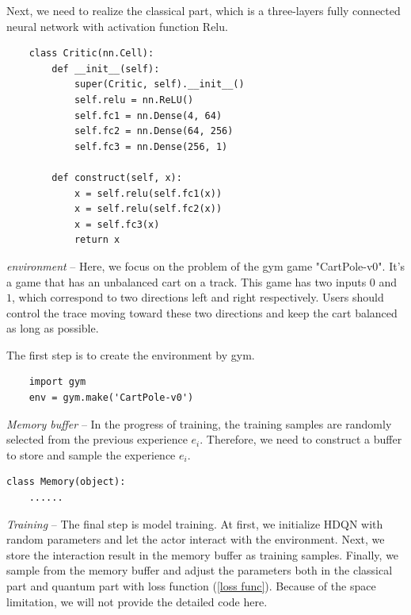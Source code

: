Next, we need to realize the classical part, which is a three-layers fully connected neural network with activation function Relu.
\begin{lstlisting}
    class Critic(nn.Cell):
        def __init__(self):
            super(Critic, self).__init__()
            self.relu = nn.ReLU()
            self.fc1 = nn.Dense(4, 64)
            self.fc2 = nn.Dense(64, 256)
            self.fc3 = nn.Dense(256, 1)
    
        def construct(self, x):
            x = self.relu(self.fc1(x))
            x = self.relu(self.fc2(x))
            x = self.fc3(x)
            return x
\end{lstlisting}

\textit{environment} -- Here, we focus on the problem of the gym game "CartPole-v0". It's a game that has an unbalanced cart on a track. This game has two inputs $0$ and $1$, which correspond to two directions left and right respectively. Users should control the trace moving toward these two directions and keep the cart balanced as long as possible.

The first step is to create the environment by gym.
\begin{lstlisting}
    import gym
    env = gym.make('CartPole-v0')
\end{lstlisting}
\textit{Memory buffer} -- In the progress of training, the training samples are randomly selected from the previous experience $e_i$. Therefore, we need to construct a buffer to store and sample the experience $e_i$.
\begin{lstlisting}
class Memory(object):
    ......
\end{lstlisting}
\textit{Training} -- The final step is model training. At first, we initialize HDQN with random parameters and let the actor interact with the environment. Next, we store the interaction result in the memory buffer as training samples. Finally, we sample from the memory buffer and adjust the parameters both in the classical part and quantum part with loss function (\ref{loss func}). Because of the space limitation, we will not provide the detailed code here.

